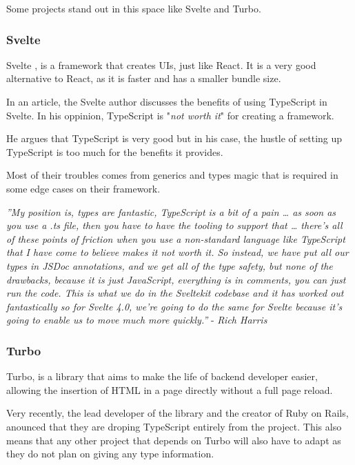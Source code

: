 \documentclass[10pt,journal,compsoc]{IEEEtran}
\begin{document}
Some projects stand out in this space like Svelte and Turbo.

\subsubsection{Svelte}

Svelte \cite{10101104}, is a framework that creates UIs, just like React. It is a very good alternative to React, as it is faster and has a smaller bundle size.

In an article, the Svelte author discusses the benefits of using TypeScript in Svelte. In his oppinion, TypeScript is "\textit{not worth it}" for creating a framework.

He argues that TypeScript is very good but in his case, the hustle of setting up TypeScript is too much for the benefits it provides.

Most of their troubles comes from generics and types magic that is required in some edge cases on their framework.

\textit{''My position is, types are fantastic, TypeScript is a bit of a pain … as soon as you use a .ts file, then you have to have the tooling to support that … there's all of these points of friction when you use a non-standard language like TypeScript that I have come to believe makes it not worth it. So instead, we have put all our types in JSDoc annotations, and we get all of the type safety, but none of the drawbacks, because it is just JavaScript, everything is in comments, you can just run the code. This is what we do in the Sveltekit codebase and it has worked out fantastically so for Svelte 4.0, we're going to do the same for Svelte because it's going to enable us to move much more quickly.''} - \textit{Rich Harris} \cite{SvelteTS}

\subsubsection{Turbo}

Turbo, is a library that aims to make the life of backend developer easier, allowing the insertion of HTML in a page directly without a full page reload.

Very recently, the lead developer of the library and the creator of Ruby on Rails, anounced that they are droping TypeScript entirely from the project. This also means that any other project that depends on Turbo will also have to adapt as they do not plan on giving any type information.
\end{document}
